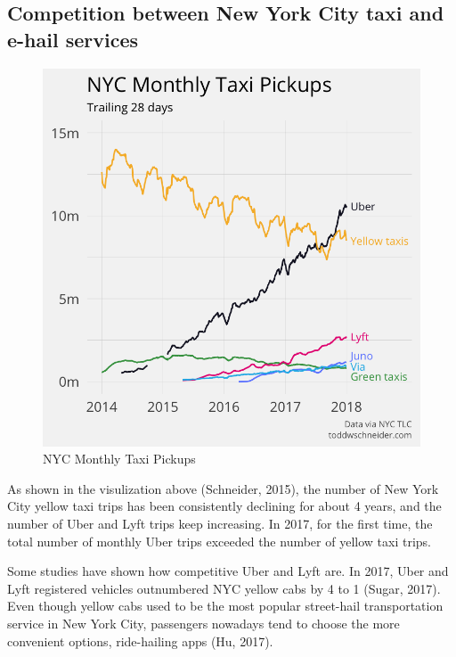\documentclass[12pt,twoside]{reedthesis}
\theoremstyle{definition}
\theoremstyle{definition}
\theoremstyle{definition}
\theoremstyle{remark}
\begin{document}
\subsection{Competition between New York City taxi and e-hail
services}\label{competition-between-new-york-city-taxi-and-e-hail-services}
\begin{figure}

{\centering \includegraphics[width=5.33in]{figure/totals_by_car_type} 

}

\caption{NYC Monthly Taxi Pickups}\label{fig:totals-by-car-type}
\end{figure}
As shown in the visulization above (Schneider, 2015), the number of New
York City yellow taxi trips has been consistently declining for about 4
years, and the number of Uber and Lyft trips keep increasing. In 2017,
for the first time, the total number of monthly Uber trips exceeded the
number of yellow taxi trips.

Some studies have shown how competitive Uber and Lyft are. In 2017, Uber
and Lyft registered vehicles outnumbered NYC yellow cabs by 4 to 1
(Sugar, 2017). Even though yellow cabs used to be the most popular
street-hail transportation service in New York City, passengers nowadays
tend to choose the more convenient options, ride-hailing apps (Hu,
2017).
\end{document}
